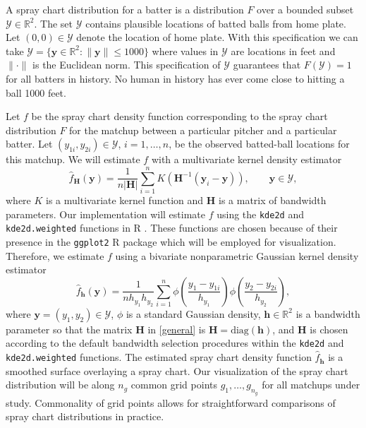 \documentclass[12pt]{article}
\newcommand{\R}{\mathbb{R}}
\newcommand{\Y}{\mathcal{Y}}
\newcommand{\Hbf}{\textbf{H}}
\newcommand{\y}{\textbf{y}}
\newcommand{\h}{\textbf{h}}
\begin{document}
A spray chart distribution for a batter is a distribution $F$ over a bounded subset $\Y \in \R^2$. The set $\Y$ contains plausible locations of batted balls from home plate. Let $(0,0) \in \Y$ denote the location of home plate. With this specification we can take $\Y = \{\y \in \R^2: \|\y\| \leq 1000\}$ where values in $\Y$ are locations in feet and $\|\cdot\|$ is the Euclidean norm. This specification of $\Y$ guarantees that $F(\Y) = 1$ for all batters in history. No human in history has ever come close to hitting a ball 1000 feet.


Let $f$ be the spray chart density function corresponding to the spray chart distribution $F$ for the matchup between a particular pitcher and a particular batter. Let $(y_{1i},y_{2i}) \in \Y$, $i = 1, \ldots, n$, be the observed batted-ball locations for this matchup. We will estimate $f$ with a multivariate kernel density estimator
\begin{equation} \label{general}
  \hat f_\Hbf(\y) = \frac{1}{n|\Hbf|}\sum_{i=1}^{n} K\left(\Hbf^{-1}(\y_i - \y)\right),
  \qquad \y \in \Y,
\end{equation}
where $K$ is a multivariate kernel function and $\Hbf$ is a matrix of bandwidth parameters. Our implementation will estimate $f$ using the \texttt{kde2d} and \texttt{kde2d.weighted} functions in R \citep{MASS, ggtern}. These functions are chosen because of their presence in the \texttt{ggplot2} R package \citep{ggplot2} which will be employed for visualization. Therefore, we estimate $f$ using a bivariate nonparametric Gaussian kernel density estimator
\begin{equation} \label{spraydens}
  \hat f_\h(\y) =
    \frac{1}{n h_{y_1}h_{y_2}}\sum_{i=1}^{n} \phi\left(\frac{y_1 - y_{1i}}{h_{y_1}}\right)
      \phi\left(\frac{y_2 - y_{2i}}{h_{y_2}}\right),
\end{equation}
where $\y = (y_1, y_2) \in \Y$, $\phi$ is a standard Gaussian density, $\h \in \R^2$ is a bandwidth parameter so that the matrix $\Hbf$ in \eqref{general} is $\Hbf = \text{diag}(\h)$, and $\Hbf$ is chosen according to the default bandwidth selection procedures within the \texttt{kde2d} and \texttt{kde2d.weighted} functions. The estimated spray chart density function $\hat f_\h$ is a smoothed surface overlaying a spray chart. Our visualization of the spray chart distribution will be along $n_g$ common grid points $g_1,\ldots,g_{n_g}$ for all matchups under study. Commonality of grid points allows for straightforward comparisons of spray chart distributions in practice.
\end{document}

